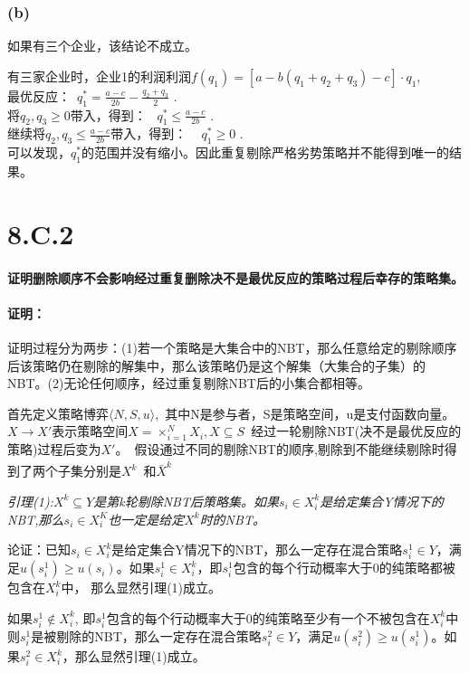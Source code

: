 \documentclass[10pt,fleqn]{article}
\begin{document}
\subsubsection*{(b)}
如果有三个企业，该结论不成立。

有三家企业时，企业1的利润利润$f(q_1)=[a-b(q_1+q_2+q_3)-c]\cdot q_1 $,\\
最优反应：~$q_1^{*}=\frac{a-c}{2b}-\frac{q_2+q_3}{2} $ .\\
将$q_2,q_3 \geq 0 $带入，得到：~ $q_1^* \leq \frac{a-c}{2b}  $ .\\
继续将$q_2,  q_3 \leq \frac{a-c}{2b} $带入，得到：
~ $q_1^* \geq 0$ . \\
可以发现，$q_1^* $的范围并没有缩小。因此重复剔除严格劣势策略并不能得到唯一的结果。

\section*{8.C.2}
\paragraph{证明删除顺序不会影响经过重复删除决不是最优反应的策略过程后幸存的策略集。} 

\paragraph{\textbf{证明：}}

证明过程分为两步：(1)若一个策略是大集合中的NBT，那么任意给定的剔除顺序后该策略仍在剔除的解集中，那么该策略仍是这个解集（大集合的子集）的NBT。(2)无论任何顺序，经过重复剔除NBT后的小集合都相等。

首先定义策略博弈$\langle N,S,u \rangle $,~其中N是参与者，S是策略空间，u是支付函数向量。~$X \to X'$表示策略空间$X= \times_{i=1}^{N}X_i,  X \subseteq S $~经过一轮剔除NBT(决不是最优反应的策略)过程后变为$X' $。~假设通过不同的剔除NBT的顺序,剔除到不能继续剔除时得到了两个子集分别是$X^k $~和$\bar{X}^{\bar{k}} $

\emph{引理(1):$X^k \subseteq Y $是第k轮剔除NBT后策略集。如果$s_i \in X_i^k$是给定集合Y情况下的NBT,那么$s_i \in X^K_i $也一定是给定$X^k$时的NBT。}

论证：已知$s_i \in X_i^k$是给定集合Y情况下的NBT，那么一定存在混合策略$s^1_i \in Y$，满足$u(s^1_i) \geq u(s_i) $。如果$s^1_i \in X_i^k$，即$s^1_i $包含的每个行动概率大于0的纯策略都被包含在$X_i^k $中， 那么显然引理(1)成立。

如果$s^1_i \notin X_i^k$, 即$s^1_i $包含的每个行动概率大于0的纯策略至少有一个不被包含在$X_i^k $中则$s^1_i $是被剔除的NBT，那么一定存在混合策略$s^2_i \in Y$，满足$u(s^2_i) \geq u(s^1_i) $。如果$s^2_i \in X_i^k$，那么显然引理(1)成立。
\end{document}
